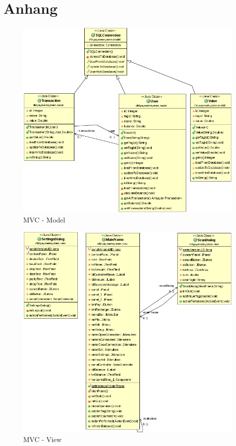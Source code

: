\documentclass[11pt]{article} %
\begin{document}
\section{Anhang}
\begin{figure}[htb] \centering
\includegraphics[width=\textwidth,keepaspectratio=true]{UML_Model.png}
\caption{MVC - Model}
\end{figure}
\begin{figure}[htb] \centering
\includegraphics[width=\textwidth,keepaspectratio=true]{UML_View.png}
\caption{MVC - View}
\end{figure}
\end{document}

